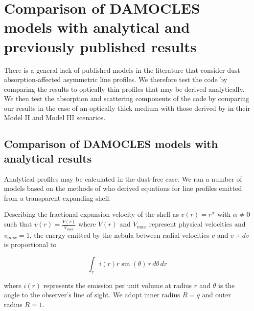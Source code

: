 \documentclass[useAMS,usenatbib,usegraphicx]{mnras}
\begin{document}


\section{Comparison of DAMOCLES models with analytical and previously published results}
\label{params}

There is a general lack of published models in the literature that 
consider dust absorption-affected asymmetric line profiles.  We therefore test 
the code by comparing the results to optically thin profiles that may be 
derived analytically.  We then test the absorption and scattering 
components of the code by comparing our results in the case of an 
optically thick medium with those derived by \citet{Lucy1989} in their 
Model II and Model III scenarios.

\subsection{Comparison of DAMOCLES models with analytical results}
\label{analytics}

Analytical profiles may be calculated in the dust-free case.  We ran a 
number of models based on the methods of \cite{Gerasimovic1933} 
who derived equations for line profiles emitted from a transparent 
expanding shell.

Describing the fractional expansion velocity of the shell as $v(r)=r^\alpha$ with 
$\alpha \neq 0$ such that $v(r)=\frac{V(r)}{V_{max}}$ where $V(r)$ and $V_{max}$ represent physical velocities and $v_{max}=1$, the energy emitted by 
the nebula between radial velocities $v$ and $v+dv$ is proportional to

\begin{equation}
\int _\tau i(r) r \sin (\theta) \, r \, d\theta \, dr
\end{equation}

\noindent where $i(r)$ represents the emission per unit volume at radius 
$r$ and $\theta$ is the angle to the observer's line of sight.  We adopt inner radius $R=q$ and outer radius $R=1$.
\end{document}
